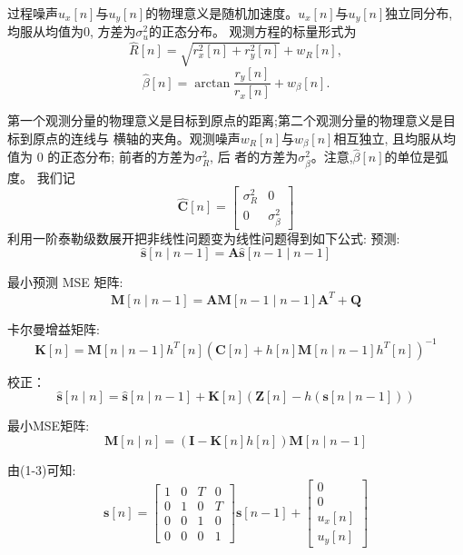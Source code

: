 \documentclass{article}
\begin{document}
过程噪声$u_{x}[n]$与$u_{y}[n]$的物理意义是随机加速度。$u_{x}[n]$与$u_{y}[n]$独立同分布, 均服从均值为0, 方差为$\sigma_{u}^{2}$的正态分布。
观测方程的标量形式为
\begin{equation}
    \hat{R}[n]=\sqrt{r_{x}^{2}[n]+r_{y}^{2}[n]}+w_{R}[n],
\end{equation}
\begin{equation}
    \hat{\beta}[n]=\arctan \frac{r_{y}[n]}{r_{x}[n]}+w_{\beta}[n] .
\end{equation}

第一个观测分量的物理意义是目标到原点的距离;第二个观测分量的物理意义是目标到原点的连线与 横轴的夹角。观测噪声$w_{R}[n] $与$w_{\beta}[n]$相互独立, 且均服从均值为 0 的正态分布; 前者的方差为$\sigma_{R}^{2}$, 后 者的方差为$\sigma_{\beta}^{2}$。注意,$ \hat{\beta}[n]$的单位是弧度。
我们记
$$
\hat{\mathbf{C}}[n]=\left[\begin{array}{cc}
\sigma_{R}^{2} & 0 \\
0 & \sigma_{\beta}^{2}
\end{array}\right]
$$
 利用一阶泰勒级数展开把非线性问题变为线性问题得到如下公式:
 预测: 
 \begin{equation}
    \hat{\mathbf{s}}[n \mid n-1]=\mathbf{A} \hat{\mathbf{s}}[n-1 \mid n-1]
 \end{equation}
 
最小预测 MSE 矩阵:
\begin{equation}
    \mathbf{M}[n \mid n-1]=\mathbf{A} \mathbf{M}[n-1 \mid n-1] \mathbf{A}^{T}+\mathbf{Q} 
\end{equation}

卡尔曼增益矩阵:
\begin{equation}
     \mathbf{K}[n]=\mathbf{M}\left[n \mid n-1 \right] h^{T}[n] 
 \left(\mathbf{C}[n]+h[n] \mathbf{M}[n \mid n-1] h^{T}[n]\right)^{-1} 
\end{equation}

校正：
\begin{equation}
    \hat{\mathbf{s}}[n \mid n] =\hat{\mathbf{s}}[n \mid n-1]+\mathbf{K}[n]    (\mathbf{Z}[n]-h(\mathbf{s}[n \mid n-1]))
\end{equation}

最小MSE矩阵:
\begin{equation}
    \mathbf{M}[n \mid n]=(\mathbf{I}-\mathbf{K}[n] h[n]) \mathbf{M}[n \mid n-1]
\end{equation}

由(1-3)可知:
\begin{equation}
    \mathbf{s}[n]=\left[\begin{array}{llll}
    1 & 0 & T & 0 \\
    0 & 1 & 0 & T \\
    0 & 0 & 1 & 0 \\
    0 & 0 & 0 & 1
    \end{array}\right]
    \mathbf{s}[n-1]+\left[\begin{array}{c}
    0 \\
    0 \\
    u_{x}[n] \\
    u_{y}[n]
    \end{array}\right]
\end{equation}
\end{document}
